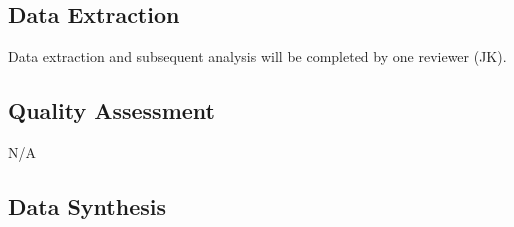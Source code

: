 \documentclass{article}
\begin{document}
\subsection{Data Extraction}
\par
Data extraction and subsequent analysis will be completed by one reviewer (JK).
\subsection{Quality Assessment}
N/A
\subsection{Data Synthesis}
\end{document}
